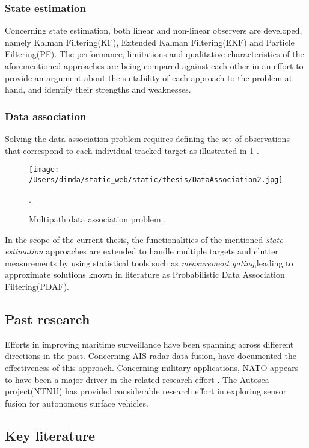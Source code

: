 \subsubsection{State estimation}
Concerning state estimation, both linear and non-linear observers are developed, namely Kalman Filtering(KF), Extended Kalman Filtering(EKF) and Particle Filtering(PF). The performance, limitations and qualitative characteristics of the aforementioned approaches are being compared against each other in an effort to provide an argument about the suitability of each approach to the problem at hand, and identify their strengths and weaknesses.
\subsubsection{Data association}
Solving the data association problem requires defining the set of observations that correspond to each individual tracked target as illustrated in \cref{fig:MultipathDA} .


\begin{figure}[H]
	\centering
	\texttt{[image: /Users/dimda/static\_web/static/thesis/DataAssociation2.jpg]}
	\caption{ Multipath data association problem \cite{Lan2019}.}.
	\label{fig:MultipathDA}
\end{figure}

In the scope of the current thesis, the functionalities of the mentioned \emph{state-estimation} approaches are extended to handle multiple targets and clutter measurements by using statistical tools such as \emph{measurement gating},leading to approximate solutions known in literature as Probabilistic Data Association Filtering(PDAF). 

\subsection{Past research}
Efforts in improving maritime surveillance have been spanning across different directions in the past. Concerning  AIS radar data fusion,  \cite{Habtemariam2015}  \cite{Heymann2015} have documented the effectiveness of this approach. Concerning military applications, NATO appears to have been a major driver in the related research effort \cite{Guerriero2008,9781586035365}. The Autosea project(NTNU)  \cite{Brekke2019}has provided considerable research effort in exploring sensor fusion for autonomous surface vehicles.
\subsection{Key literature}


